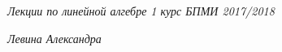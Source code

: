 \documentclass[a4paper]{article}
\begin{document}
    \begin{flushright}
      \textit{Лекции по линейной алгебре 1 курс БПМИ 2017/2018}
      
      \textit{Левина Александра}
    \end{flushright}

    \tableofcontents

    \newpage

    
    
    
    
    
    
    
\end{document}
